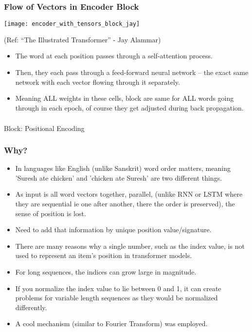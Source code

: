\begin{frame}[fragile]\frametitle{Flow of Vectors in Encoder Block}


\begin{center}
\texttt{[image: encoder\_with\_tensors\_block\_jay]}


{\tiny (Ref: ``The Illustrated Transformer'' - Jay Alammar)}
\end{center}		


\begin{itemize}
\item The word at each position passes through a self-attention process. 
\item Then, they each pass through a feed-forward neural network -- the exact same network with each vector flowing through it separately.
\item Meaning ALL weights in these cells, block are same for ALL words going through in each epoch, of course they get adjusted during back propagation.
\end{itemize}

\end{frame}


\begin{frame}[fragile]\frametitle{}
\begin{center}
{\Large Block: Positional Encoding}
\end{center}
\end{frame}

\begin{frame}[fragile]\frametitle{Why?}


\begin{itemize}
\item In languages like English (unlike Sanskrit) word order matters, meaning 'Suresh ate chicken' and 'chicken ate Suresh' are two different things.
\item As input is all word vectors together, parallel, (unlike RNN or LSTM where they are sequential ie one after another, there the order is preserved), the sense of position is lost.
\item Need to add that information by unique position value/signature.
\item There are many reasons why a single number, such as the index value, is not used to represent an item’s position in transformer models. 
\item For long sequences, the indices can grow large in magnitude. 
\item If you normalize the index value to lie between 0 and 1, it can create problems for variable length sequences as they would be normalized differently.
\item A cool mechanism (similar to Fourier Transform) was employed.
\end{itemize}

\end{frame}


